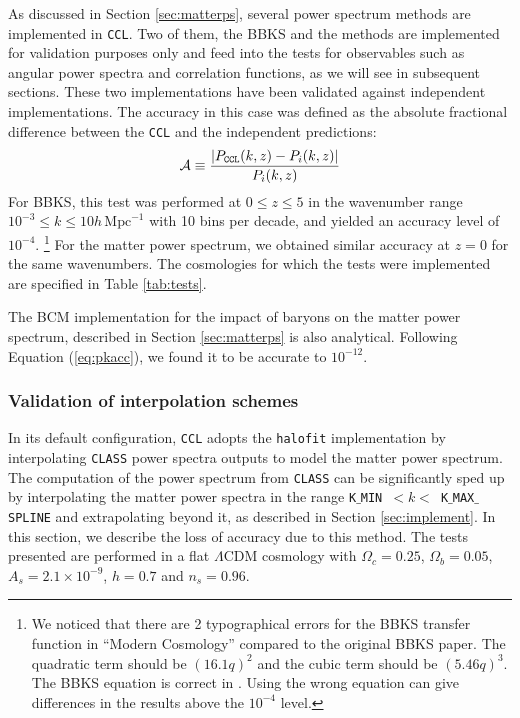 \documentclass[\docopts]{\docclass}
\newcommand{\ccl}{{\tt CCL}\xspace}
\newcommand{\halofit}{{\tt halofit}\xspace}
\newcommand{\class}{{\tt CLASS}\xspace}
\begin{document}
As discussed in Section \ref{sec:matterps}, several power spectrum methods are implemented in \ccl. Two of them, the BBKS \citep{BBKS} and the \citet{1998ApJ...496..605E} methods are implemented for validation purposes only and feed into the tests for observables such as angular power spectra and correlation functions, as we will see in subsequent sections. These two implementations have been validated against independent implementations. The accuracy in this case was defined as the absolute fractional difference between the \ccl and the independent predictions:
\begin{equation}
  \mathcal{A}\equiv \frac{|P_{\tt CCL}(k,z)-P_{i}(k,z)|}{P_i(k,z)}
  \label{eq:pkacc}
\end{equation}
For BBKS, this test was performed at $0\leq z \leq 5$ in the wavenumber range $10^{-3} \leq k \leq 10 h\,\text{Mpc}^{-1}$ with 10 bins per decade, and yielded an accuracy level of $10^{-4}$.
\footnote{We noticed that there are 2 typographical errors for the BBKS transfer function in ``Modern Cosmology'' \citep{DodelsonBook} compared to the original BBKS paper. The quadratic term should be $(16.1q)^2$ and the cubic term should be $(5.46q)^3$. The BBKS equation is correct in \citet{PeacockBook}. Using the wrong equation can give differences in the results above the $10^{-4}$ level.}
For the \citet{1998ApJ...496..605E} matter power spectrum, we obtained similar accuracy at $z=0$ for the same wavenumbers. The cosmologies for which the tests were implemented are specified in Table \ref{tab:tests}.

The BCM implementation for the impact of baryons on the matter power spectrum, described in Section \ref{sec:matterps} is also analytical. Following Equation (\ref{eq:pkacc}), we found it to be accurate to $10^{-12}$.

\subsubsection{Validation of interpolation schemes}
\label{ss:classval}

In its default configuration, \ccl adopts the \halofit \citep{CLASS_halofit} implementation by interpolating \class power spectra outputs to model the matter power spectrum. The computation of the power spectrum from \class can be significantly sped up by interpolating the matter power spectra in the range {\tt K$\_$MIN}~$<k<$~{\tt K$\_$MAX$\_$SPLINE} and extrapolating beyond it, as described in Section \ref{sec:implement}. In this section, we describe the loss of accuracy due to this method. The tests presented are performed in a flat $\Lambda$CDM cosmology with $\Omega_c=0.25$, $\Omega_b=0.05$, $A_s=2.1\times10^{-9}$, $h=0.7$ and $n_s=0.96$.
\end{document}
